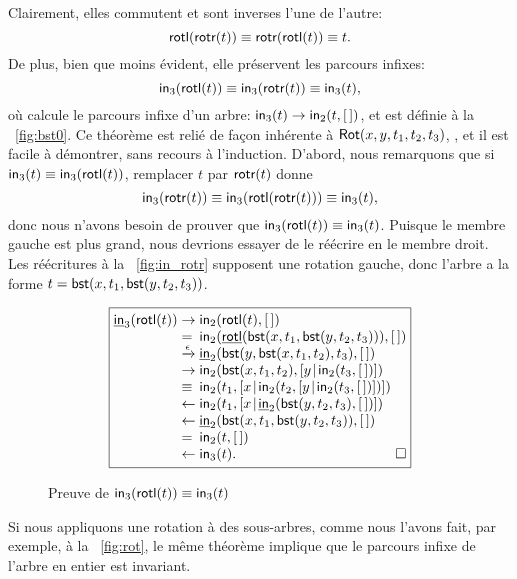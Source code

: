 Clairement, elles commutent et sont inverses l'une de l'autre:
\begin{equation*}
\abovedisplayskip=5pt
\belowdisplayskip=5pt
\fun{rotl}(\fun{rotr}(t)) \equiv \fun{rotr}(\fun{rotl}(t)) \equiv t.
\end{equation*}
De plus, bien que moins évident, elle préservent les parcours infixes:
\begin{equation*}
  \abovedisplayskip=5pt
  \belowdisplayskip=5pt
  \fun{in}_3(\fun{rotl}(t)) \equiv \fun{in}_3(\fun{rotr}(t)) \equiv
  \fun{in}_3(t),
\end{equation*}
où  calcule le parcours
infixe d'un arbre: \(\textsf{in}_3(t) \rightarrow \textsf{in}_2(t,[\,])\), et
 est définie à la
\fig~\vref{fig:bst0}. Ce théorème est relié de façon inhérente à
\(\textsf{Rot}({x,y,t_1,t_2,t_3})\),
, et il est facile à démontrer, sans recours à
l'induction. D'abord, nous remarquons que si \(\textsf{in}_3(t) \equiv
\textsf{in}_3(\textsf{rotl}(t))\), remplacer \(t\) par \(\textsf{rotr}(t)\)
donne
\begin{equation*}
  \textsf{in}_3(\textsf{rotr}(t))
  \equiv \textsf{in}_3(\textsf{rotl}(\textsf{rotr}(t))) \equiv \textsf{in}_3(t),
\end{equation*}
donc nous n'avons besoin de prouver que \(\textsf{in}_3(\textsf{rotl}(t))
\equiv \textsf{in}_3(t)\). Puisque le membre gauche est plus grand, nous
devrions essayer de le réécrire en le membre droit. Les réécritures à
la \fig~\vref{fig:in_rotr} supposent une rotation gauche, donc l'arbre
a la forme \(t=\textsf{bst}(x,t_1,\textsf{bst}(y,t_2,t_3))\).
\begin{figure}
  \begin{equation*}
    \boxed{
      \begin{array}{@{}r@{\;}l@{\;}l@{}}
  \ufun{in}_3(\fun{rotl}(t))
  & \rightarrow & \fun{in}_2(\fun{rotl}(t),\el)\\
  & = & \fun{in}_2(\ufun{rotl}(\fun{bst}(x,t_1,\fun{bst}(y,t_2,t_3))),\el)\\
  & \xrightarrow{\smash{\epsilon}} &
  \ufun{in}_2(\fun{bst}(y,\fun{bst}(x,t_1,t_2),t_3),\el)\\
  & \rightarrow &
  \fun{in}_2(\fun{bst}(x,t_1,t_2),\cons{y}{\fun{in}_2(t_3,\el)})\\
  & \equiv &
 \fun{in}_2(t_1,\cons{x}{\fun{in}_2(t_2,\cons{y}{\fun{in}_2(t_3,\el)})})\\
  & \leftarrow &
  \fun{in}_2(t_1,\cons{x}{\ufun{in}_2(\fun{bst}(y,t_2,t_3),\el)})\\
  & \leftarrow &
  \ufun{in}_2(\fun{bst}(x,t_1,\fun{bst}(y,t_2,t_3)),\el)\\
  & = &
  \fun{in}_2(t,\el)\\
  & \leftarrow &
  \fun{in}_3(t).\hfill\Box
\end{array}
}
\end{equation*}
\caption{Preuve de \(\textsf{in}_3(\textsf{rotl}(t)) \equiv \textsf{in}_3(t)\)}
\label{fig:in_rotr}
\end{figure}
Si nous appliquons une rotation à des sous-arbres, comme nous l'avons
fait, par exemple, à la \fig~\vref{fig:rot}, le même théorème implique
que le parcours infixe de l'arbre en entier est invariant.

